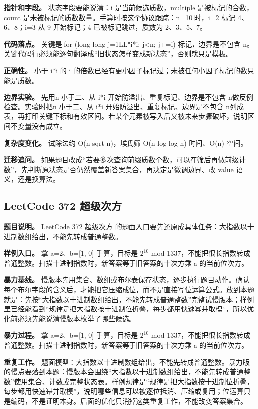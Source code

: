 \textbf{指针和字段。} 状态字段要能说清：i 是当前候选质数，multiple 是被标记的合数，count 是未被标记的质数数量。手算时按这个协议跟踪：n=10 时，i=2 标记 4、6、8；i=3 从 9 开始标记；4 已被标记跳过，质数为 2、3、5、7。

\textbf{代码落点。} 关键是 for (long long j=1LL*i*i; j<n; j+=i) 标记，边界是不包含 n。关键代码行必须能逐句翻译成“旧状态怎样变成新状态”，否则就只是模板。

\textbf{正确性。} 小于 i*i 的 i 的倍数已经有更小因子标记过；未被任何小因子标记的数只能是质数。

\textbf{边界实验。} 先用n 小于二、从 i*i 开始防溢出、重复标记、边界是不包含 n做反例检查。实验时把n 小于二、从 i*i 开始防溢出、重复标记、边界是不包含 n列成表，再打印关键下标和有效区间。若某个元素被写入后又被未来步骤破坏，说明区间不变量没有成立。

\textbf{复杂度变化。} 试除法约 O(n sqrt n)，埃氏筛 O(n log log n) 时间、O(n) 空间。

\textbf{迁移追问。} 如果题目改成“若要多次查询前缀质数个数，可以在筛后再做前缀计数”，先判断原状态是否仍然覆盖新答案集合，再决定是微调边界、改 value 语义，还是换算法。

\subsection{LeetCode 372 超级次方}

\textbf{题目说明。} LeetCode 372 超级次方 的题面入口要先还原成具体任务：大指数以十进制数组给出，不能先转成普通整数。

\textbf{样例入口。} 拿 a=2、b=[1, 0] 手算，目标是 \ensuremath{2^{10}} mod 1337，不能把很长指数转成普通整数。扫描十进制指数时，新答案等于旧答案的十次方乘 a 的当前位次方。

\textbf{暴力基线。} 慢版本先用集合、数组或布尔表保存状态，逐步执行题目动作。确认每个布尔字段的含义后，才能把它压缩成位，而不是直接写位运算公式。放到本题就是：先按“大指数以十进制数组给出，不能先转成普通整数”完整试慢版本；样例里已经能看到“规律是把大指数按十进制位折叠，每步都用快速幂并取模”，所以优化前必须先能说清慢版本枚举了哪些候选。

\textbf{暴力过程。} 拿 a=2、b=[1, 0] 手算，目标是 \ensuremath{2^{10}} mod 1337，不能把很长指数转成普通整数。扫描十进制指数时，新答案等于旧答案的十次方乘 a 的当前位次方。

\textbf{重复工作。} 题面模型：大指数以十进制数组给出，不能先转成普通整数。暴力版的慢点要落到本题：慢版本会围绕“大指数以十进制数组给出，不能先转成普通整数”使用集合、计数或完整状态表。样例规律是“规律是把大指数按十进制位折叠，每步都用快速幂并取模”，说明哪些信息可以被逐位抵消、压缩或复用；位运算只是编码，不是证明本身。后面的优化只消掉这类重复工作，不能改变答案集合。


